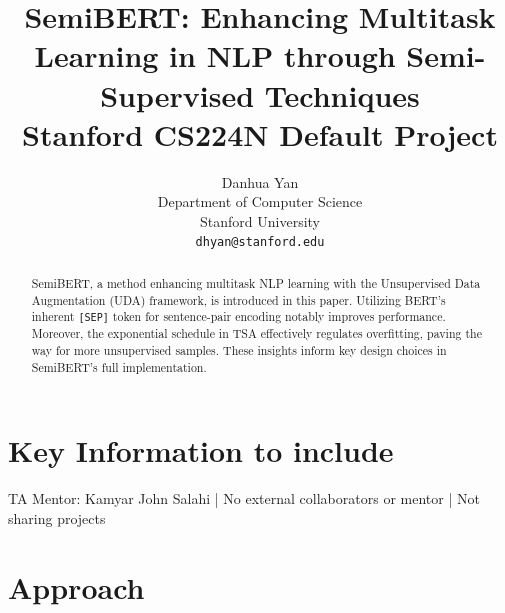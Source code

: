 \documentclass{article}
\title{
  SemiBERT: Enhancing Multitask Learning in NLP through Semi-Supervised Techniques \\
  \vspace{1em}
  \small{\normalfont Stanford CS224N Default Project}  %
}
\author{
  Danhua Yan \\
  Department of Computer Science \\
  Stanford University \\
  \texttt{dhyan@stanford.edu} \\
}
\begin{document}
\maketitle

\begin{abstract}
  SemiBERT, a method enhancing multitask NLP learning with the Unsupervised Data 
  Augmentation (UDA) framework, is introduced in this paper. Utilizing BERT's inherent 
  \texttt{[SEP]} token for sentence-pair encoding notably improves performance. Moreover, 
  the exponential schedule in TSA effectively regulates overfitting, paving the way for 
  more unsupervised samples. These insights inform key design choices in SemiBERT's full 
  implementation.
\end{abstract}


\section{Key Information to include}
TA Mentor: Kamyar John Salahi | No external collaborators or mentor | Not sharing projects


\section{Approach}
\end{document}
